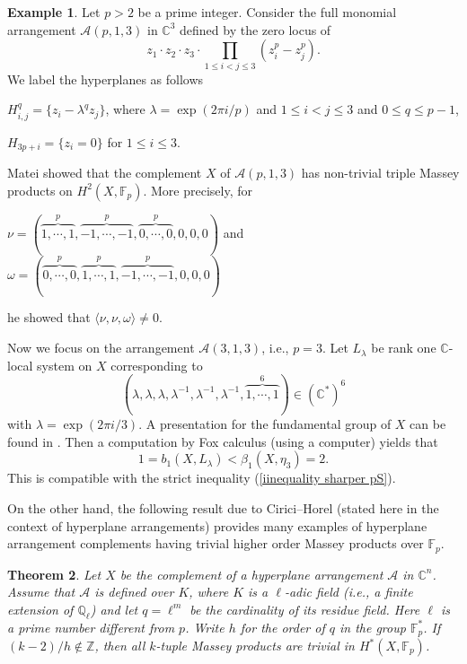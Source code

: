 \documentclass[12pt,leqno,twoside]{amsart}
\theoremstyle{plain}
\newtheorem{theorem}{Theorem}[section]
\theoremstyle{definition}
\newtheorem{ex}[theorem]{Example}
\newcommand{\C}{\mathbb{C}}
\newcommand{\Z}{\mathbb{Z}}
\newcommand{\Q}{\mathbb{Q}}
\newcommand{\F}{\mathbb{F}}
\newcommand{\sA}{\mathcal{A}}
\begin{document}
\begin{ex} \label{example Matei}
Let $p>2$ be a prime integer. Consider the full monomial arrangement $\sA(p,1,3)$ in $\C^3$ defined by the zero locus of
$$ z_1\cdot z_2 \cdot z_3 \cdot\prod_{1\leq i<j\leq 3} (z_i^p-z_j^p).$$
We label the hyperplanes as follows
\begin{center}
    $H_{i,j}^q=\{ z_i-\lambda^q z_j\}$, where $\lambda=\exp(2\pi i/p)$ and $1\leq i<j\leq 3$ and $0\leq q \leq p-1$,
\end{center}
\begin{center}
   $H_{3p+i}=\{z_i=0\} $ for $1\leq i \leq 3$. 
\end{center}
Matei showed \cite{Mat} that the complement $X$ of  $\sA(p,1,3)$ has non-trivial  triple Massey products on $H^2(X,\F_p)$. More precisely,  for
    \begin{center}
        $\nu=(\overbrace{1, \cdots, 1}^{p}, \overbrace{-1, \cdots, -1}^{p},\overbrace{0, \cdots, 0}^{p},0,0,0)$ and $\omega=(\overbrace{0, \cdots, 0}^{p},\overbrace{1, \cdots, 1}^{p}, \overbrace{-1, \cdots, -1}^{p},0,0,0)$
    \end{center}
  he showed that $\langle\nu,\nu,\omega\rangle\neq 0$.   

Now we focus on the arrangement  $\sA(3,1,3)$, i.e., $p=3$. 
  Let $L_\lambda$ be rank one $\C$-local system on $X$ corresponding to $$(\lambda, \lambda, \lambda, \lambda^{-1}, \lambda^{-1}, \lambda^{-1},\overbrace{1, \cdots, 1}^{6})\in (\C^*)^{6} $$
  with $\lambda=\exp(2\pi i/3)$.
A presentation for the fundamental group of $X$ can be found in \cite[Section 3.2]{Mat}.
 Then a computation by Fox calculus (using a computer) yields that
  $$1=b_1(X,L_\lambda)< \beta_1(X,\eta_3)=2. $$
  This is compatible with the strict inequality (\ref{iinequality sharper pS}).
\end{ex}



On the other hand, the following result due to Cirici--Horel (stated here in the context of hyperplane arrangements) provides many examples of hyperplane arrangement complements having trivial higher order Massey products over $\F_p$.

\begin{theorem}\cite[Theorem 7.12]{CH22,CH24}
    Let $X$ be the complement of a hyperplane arrangement $\sA$ in $\C^n$. 
    Assume that $\sA$ is defined over $K$, where $K$ is a $\ell$-adic field (i.e., a finite extension of $\Q_\ell$) and let $q =\ell^m$ be the cardinality of its residue field. Here $\ell$ is a prime number different from $p$. Write $h$ for the order of $q$ in the group $\F_p^*$. If $(k-2)/h\notin \Z$, then all $k$-tuple Massey products are trivial in $H^*(X,\F_p)$. \end{theorem}
\end{document}
